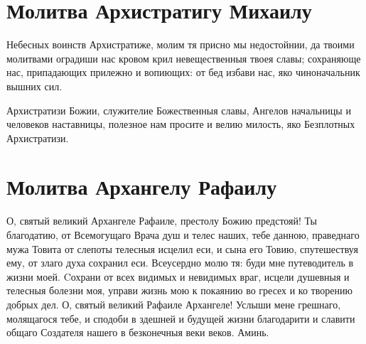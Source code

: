 \section{Молитва Архистратигу Михаилу}\begin{mymulticols}



Небесных воинств Архистратиже, молим тя присно мы недостойнии, да твоими молитвами оградиши нас кровом крил невещественныя твоея славы; сохраняюще нас, припадающих прилежно и вопиющих: от бед избави нас, яко чиноначальник вышних сил.


Архистратизи Божии, служителие Божественныя славы, Ангелов начальницы и человеков наставницы, полезное нам просите и велию милость, яко Безплотных Архистратизи.

\end{mymulticols}

\section{Молитва Архангелу Рафаилу}\begin{mymulticols}


О, святый великий Архангеле Рафаиле, престолу Божию предстояй! Ты благодатию, от Всемогущаго Врача душ и телес наших, тебе данною, праведнаго мужа Товита от слепоты телесныя исцелил еси, и сына его Товию, спутешествуя ему, от злаго духа сохранил еси. Всеусердно молю тя: буди мне путеводитель в жизни моей. Cохрани от всех видимых и невидимых враг, исцели душевныя и телесныя болезни моя, управи жизнь мою к покаянию во гресех и ко творению добрых дел. О, святый великий Рафаиле Архангеле! Услыши мене грешнаго, молящагося тебе, и сподоби в здешней и будущей жизни благодарити и славити общаго Создателя нашего в безконечныя веки веков. Аминь. 

\end{mymulticols}

